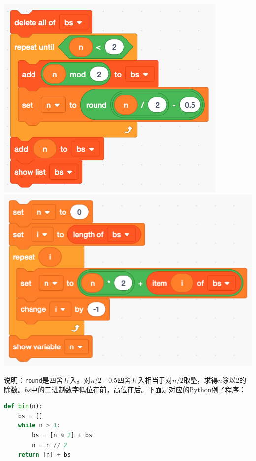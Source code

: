 \documentclass[b5paper]{article}
\begin{document}
\begin{Answer}[ref={ex:numerals}]
{\begin{center}
 \includegraphics[scale=0.3]{img/scratch-bin}
 \qquad
 \includegraphics[scale=0.3]{img/scratch-dec}
 \label{fig:bin-dec-scratch}
\end{center}

说明：\lstinline|round|是四舍五入。对$n/2$ - 0.5四舍五入相当于对$n/2$取整，求得$n$除以2的除数。$bs$中的二进制数字低位在前，高位在后。下面是对应的Python例子程序：

\begin{lstlisting}[language=Python, frame=single]
def bin(n):
    bs = []
    while n > 1:
        bs = [n % 2] + bs
        n = n // 2
    return [n] + bs


\end{lstlisting}}
\end{Answer}
\end{document}

